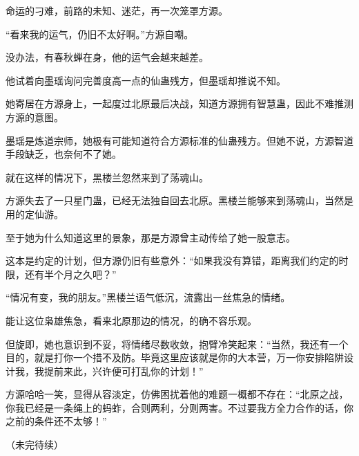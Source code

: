 \begin{this_body}
命运的刁难，前路的未知、迷茫，再一次笼罩方源。

“看来我的运气，仍旧不太好啊。”方源自嘲。

没办法，有春秋蝉在身，他的运气会越来越差。

他试着向墨瑶询问完善度高一点的仙蛊残方，但墨瑶却推说不知。

她寄居在方源身上，一起度过北原最后决战，知道方源拥有智慧蛊，因此不难推测方源的意图。

墨瑶是炼道宗师，她极有可能知道符合方源标准的仙蛊残方。但她不说，方源智道手段缺乏，也奈何不了她。

就在这样的情况下，黑楼兰忽然来到了荡魂山。

方源失去了一只星门蛊，已经无法独自回去北原。黑楼兰能够来到荡魂山，当然是用的定仙游。

至于她为什么知道这里的景象，那是方源曾主动传给了她一股意志。

这本是约定的计划，但方源仍旧有些意外：“如果我没有算错，距离我们约定的时限，还有半个月之久吧？”

“情况有变，我的朋友。”黑楼兰语气低沉，流露出一丝焦急的情绪。

能让这位枭雄焦急，看来北原那边的情况，的确不容乐观。

但旋即，她也意识到不妥，将情绪尽数收敛，抱臂冷笑起来：“当然，我还有一个目的，就是打你一个措不及防。毕竟这里应该就是你的大本营，万一你安排陷阱设计我，我提前来此，兴许便可打乱你的计划！”

方源哈哈一笑，显得从容淡定，仿佛困扰着他的难题一概都不存在：“北原之战，你我已经是一条绳上的蚂蚱，合则两利，分则两害。不过要我方全力合作的话，你之前的条件还不太够！”

（未完待续）

\end{this_body}

